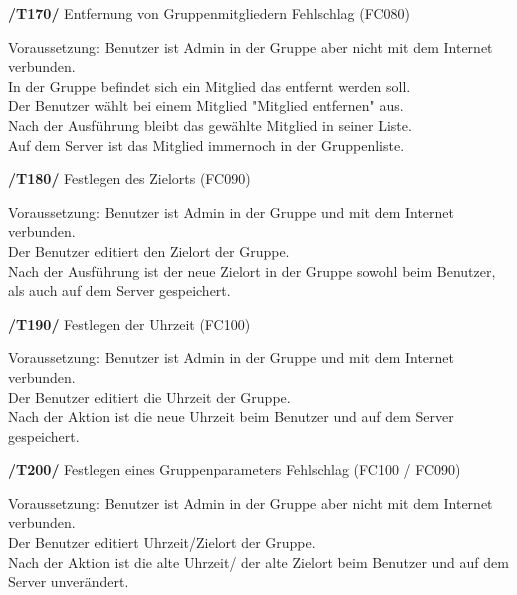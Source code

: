 \begin{itemize}
\begin{itemize}
\begin{itemize}
\begin{itemize}
\textbf{/T170/} Entfernung von Gruppenmitgliedern Fehlschlag (FC080)\\
\begin{itemize}
Voraussetzung: Benutzer ist Admin in der Gruppe aber nicht mit dem Internet verbunden.\\
In der Gruppe befindet sich ein Mitglied das entfernt werden soll.\\
Der Benutzer wählt bei einem Mitglied "Mitglied entfernen" aus.    \\
Nach der Ausführung bleibt das gewählte Mitglied in seiner Liste.   \\
Auf dem Server ist das Mitglied immernoch in der Gruppenliste.       \\
\end{itemize}

\textbf{/T180/} Festlegen des Zielorts (FC090)\\
\begin{itemize}
Voraussetzung: Benutzer ist Admin in der Gruppe und mit dem Internet verbunden.\\
Der Benutzer editiert den Zielort der Gruppe.                                   \\
Nach der Ausführung ist der neue Zielort in der Gruppe sowohl beim Benutzer,     \\
als auch auf dem Server gespeichert.                                              \\
\end{itemize}

\textbf{/T190/} Festlegen der Uhrzeit (FC100)\\
\begin{itemize}
Voraussetzung: Benutzer ist Admin in der Gruppe und mit dem Internet verbunden.    \\
Der Benutzer editiert die Uhrzeit der Gruppe.                                       \\
Nach der Aktion ist die neue Uhrzeit beim Benutzer und auf dem Server gespeichert.   \\
\end{itemize}

\textbf{/T200/} Festlegen eines Gruppenparameters Fehlschlag (FC100 / FC090)\\
\begin{itemize}
Voraussetzung: Benutzer ist Admin in der Gruppe aber nicht mit dem Internet verbunden.\\
Der Benutzer editiert Uhrzeit/Zielort der Gruppe.                                      \\
Nach der Aktion ist die alte Uhrzeit/ der alte Zielort beim Benutzer und auf dem Server unverändert.\\
\end{itemize}


\end{itemize}
\end{itemize}
\end{itemize}
\end{itemize}

